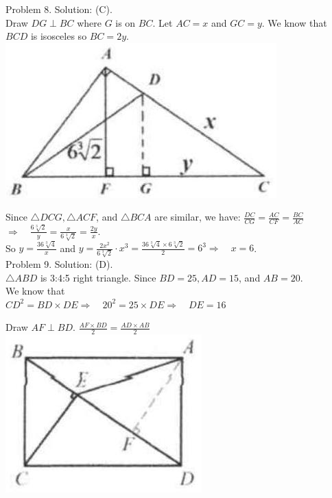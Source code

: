 \documentclass[10pt]{article}
\begin{document}
Problem 8. Solution: (C).\\
Draw \(D G \perp B C\) where \(G\) is on \(B C\). Let \(A C=x\) and \(G C=y\). We know that \(B C D\) is isosceles so \(B C=2 y\).\\
\includegraphics[max width=\textwidth, center]{2025_04_17_97bc1f7e44d93c271a88g-094(1)}


Since \(\triangle D C G, \triangle A C F\), and \(\triangle B C A\) are similar, we have: \(\frac{D C}{C G}=\frac{A C}{C F}=\frac{B C}{A C}\)\\
\(\Rightarrow \quad \frac{6 \sqrt[3]{2}}{y}=\frac{x}{6 \sqrt[3]{2}}=\frac{2 y}{x}\).\\
So \(y=\frac{36 \sqrt[3]{4}}{x}\) and \(y=\frac{2 x^{2}}{6 \sqrt[3]{2}} \cdot x^{3}=\frac{36 \sqrt[3]{4} \times 6 \sqrt[3]{2}}{2}=6^{3} \Rightarrow \quad x=6\).\\
Problem 9. Solution: (D).\\
\(\triangle A B D\) is 3:4:5 right triangle. Since \(B D=25, A D=15\), and \(A B=20\).\\
We know that\\
\(C D^{2}=B D \times D E \Rightarrow \quad 20^{2}=25 \times D E \Rightarrow \quad D E=16\)

Draw \(A F \perp B D\). \(\frac{A F \times B D}{2}=\frac{A D \times A B}{2}\)\\
\includegraphics[max width=\textwidth, center]{2025_04_17_97bc1f7e44d93c271a88g-095}
\end{document}
